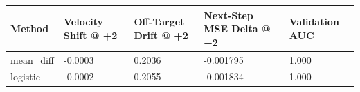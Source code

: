 \begin{tabular}{lllll}
\toprule
Method & Velocity Shift @ +2 & Off-Target Drift @ +2 & Next-Step MSE Delta @ +2 & Validation AUC \\
\midrule
mean\_diff & -0.0003 & 0.2036 & -0.001795 & 1.000 \\
logistic & -0.0002 & 0.2055 & -0.001834 & 1.000 \\
\bottomrule
\end{tabular}
